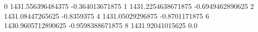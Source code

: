 0 1431.556396484375 -0.364013671875
1 1431.2254638671875 -0.6949462890625
2 1431.08447265625 -0.8359375
4 1431.05029296875 -0.8701171875
6 1430.9605712890625 -0.9598388671875
8 1431.92041015625 0.0
